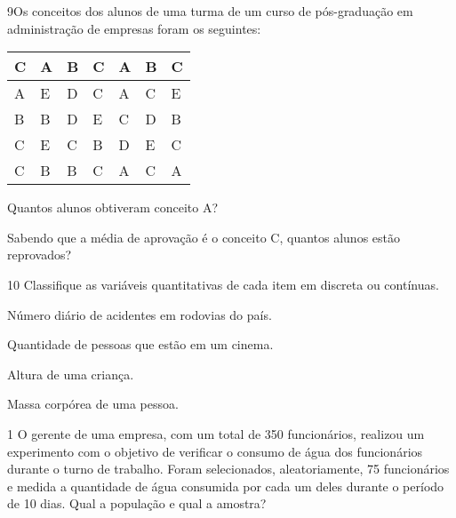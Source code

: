 {

\num{9}Os conceitos dos alunos de uma turma de um curso de pós-graduação em
administração de empresas foram os seguintes:

\begin{longtable}[]{@{}lllllll@{}}
\toprule
C & A & B & C & A & B & C\tabularnewline
\midrule
\endhead
A & E & D & C & A & C & E\tabularnewline
B & B & D & E & C & D & B\tabularnewline
C & E & C & B & D & E & C\tabularnewline
C & B & B & C & A & C & A\tabularnewline
\bottomrule
\end{longtable}

\begin{escolha}
\item
  Quantos alunos obtiveram conceito A?


\item
  Sabendo que a média de aprovação é o conceito C, quantos alunos estão
  reprovados?

\end{escolha}


\num{10} Classifique as variáveis quantitativas de cada item em discreta ou
contínuas.

\begin{escolha}
\item
  Número diário de acidentes em rodovias do país.


\item
  Quantidade de pessoas que estão em um cinema.


\item
  Altura de uma criança.


\item
  Massa corpórea de uma pessoa.

\end{escolha}



\num{1} O gerente de uma empresa, com um total de 350 funcionários,
realizou um experimento com o objetivo de verificar o consumo de água
dos funcionários durante o turno de trabalho. Foram selecionados,
aleatoriamente, 75 funcionários e medida a quantidade de água consumida
por cada um deles durante o período de 10 dias. Qual a população e qual
a amostra?

}
